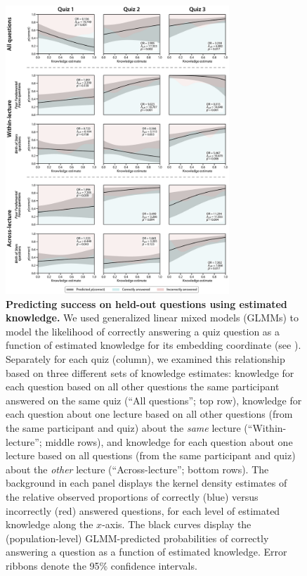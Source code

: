 \documentclass[10pt]{article}
\renewcommand{\nameref}[1]{\mbox{\textit{\oldnameref{#1}}}}
\begin{document}
\begin{figure}[tp]
    \centering

    \includegraphics[width=0.75\textwidth]{figs/predict-knowledge-questions}
    \caption{\textbf{Predicting success on held-out questions using estimated
    knowledge.} We used generalized linear mixed models (GLMMs) to model the
    likelihood of correctly answering a quiz question as a function of
    estimated knowledge for its embedding coordinate (see
    \nameref{subsec:glmm}). Separately for each quiz (column), we examined this
    relationship based on three different sets of knowledge estimates:
    knowledge for each question based on all other questions the same
    participant answered on the same quiz (``All questions''; top row),
    knowledge for each question about one lecture based on all other questions
    (from the same participant and quiz) about the \textit{same} lecture
    (``Within-lecture''; middle rows), and knowledge for each question about
    one lecture based on all questions (from the same participant and quiz)
    about the \textit{other} lecture (``Across-lecture''; bottom rows).
    The background in each panel displays the kernel density estimates of the
    relative observed proportions of correctly (blue) versus incorrectly (red)
    answered questions, for each level of estimated knowledge along the
    $x$-axis. The black curves display the (population-level) GLMM-predicted
    probabilities of correctly answering a question as a function of estimated
    knowledge. Error ribbons denote the 95\% confidence
    intervals.}

    \label{fig:predictions}
\end{figure}
\end{document}
